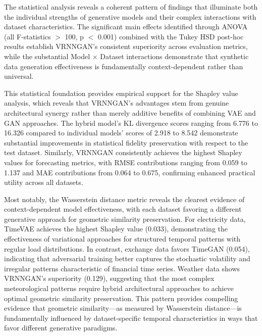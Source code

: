 \documentclass{article}
\begin{document}
The statistical analysis reveals a coherent pattern of findings that illuminate both the individual strengths of generative models and their complex interactions with dataset characteristics. The significant main effects identified through ANOVA (all F-statistics $>$ 100, p $<$ 0.001) combined with the Tukey HSD post-hoc results establish VRNNGAN's consistent superiority across evaluation metrics, while the substantial Model × Dataset interactions demonstrate that synthetic data generation effectiveness is fundamentally context-dependent rather than universal.

This statistical foundation provides empirical support for the Shapley value analysis, which reveals that VRNNGAN's advantages stem from genuine architectural synergy rather than merely additive benefits of combining VAE and GAN approaches. The hybrid model's KL divergence scores ranging from 6.776 to 16.326 compared to individual models' scores of 2.918 to 8.542 demonstrate substantial improvements in statistical fidelity preservation with respect to the test dataset. Similarly, VRNNGAN consistently achieves the highest Shapley values for forecasting metrics, with RMSE contributions ranging from 0.059 to 1.137 and MAE contributions from 0.064 to 0.675, confirming enhanced practical utility across all datasets. %

Most notably, the Wasserstein distance metric reveals the clearest evidence of context-dependent model effectiveness, with each dataset favoring a different generative approach for geometric similarity preservation. For electricity data, TimeVAE achieves the highest Shapley value (0.033), demonstrating the effectiveness of variational approaches for structured temporal patterns with regular load distributions. In contrast, exchange data favors TimeGAN (0.054), indicating that adversarial training better captures the stochastic volatility and irregular patterns characteristic of financial time series. Weather data shows VRNNGAN's superiority (0.129), suggesting that the most complex meteorological patterns require hybrid architectural approaches to achieve optimal geometric similarity preservation. This pattern provides compelling evidence that geometric similarity—as measured by Wasserstein distance—is fundamentally influenced by dataset-specific temporal characteristics in ways that favor different generative paradigms.
\end{document}
